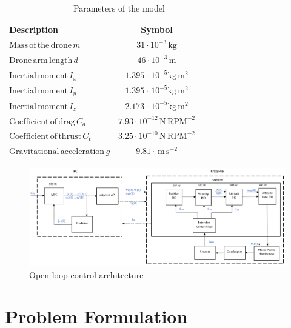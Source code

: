 \documentclass[conference]{IEEEtran}
\begin{document}
\begin{table}[htbp]
	\small
	\begin{center}
		\begin{tabular}{lccccl}\toprule
			\textbf{Description} &  \textbf{Symbol}\\
			\midrule
            $\mathrm{Mass\,of\,the\,drone} \,m$ & $\mathrm{31 \cdot 10^{-3}\,\mathrm{kg}}$  \\
			$\mathrm{Drone\,arm\,length} \,d$ & $46 \cdot \mathrm{10^{-3}}\,\mathrm{m}$ \\
			$\mathrm{Inertial\,moment} \,I_{x}$ & $1.395 \cdot\,\mathrm{10^{-5}} \mathrm{kg\,m^2}$ \\
            $\mathrm{Inertial\,moment} \,I_{y}$ & $1.395 \cdot\,\mathrm{10^{-5}} \mathrm{kg\,m^2}$ \\
            $\mathrm{Inertial\,moment} \,I_{z}$ & $2.173 \cdot\,\mathrm{10^{-5}} \mathrm{kg\,m^2}$ \\
            $\mathrm{Coefficient\,of\,drag} \,C_d$ & $\mathrm{7.93 \cdot 10^{-12}}\,\mathrm{N\,RPM^{-2}}$ \\
			$\mathrm{Coefficient\,of\,thrust} \,C_t$ & $\mathrm{3.25 \cdot 10^{-10}}\,\mathrm{N\,RPM^{-2}}$ \\
			$\mathrm{Gravitational\,acceleration} \,g$ & $\mathrm{9.81 \cdot\,m\,s^{-2}}$ \\
			\bottomrule
		\end{tabular}
	\end{center}
	\caption{Parameters of the model}
	\label{table1}
\end{table}

\begin{figure}[htbp]
	\centerline{\includegraphics[scale = 0.6]{figures/Screenshot_OL.png} }
	\caption{Open loop control architecture }
	\label{Fig2}
\end{figure}

\section{Problem Formulation}\label{Section3}
\end{document}
